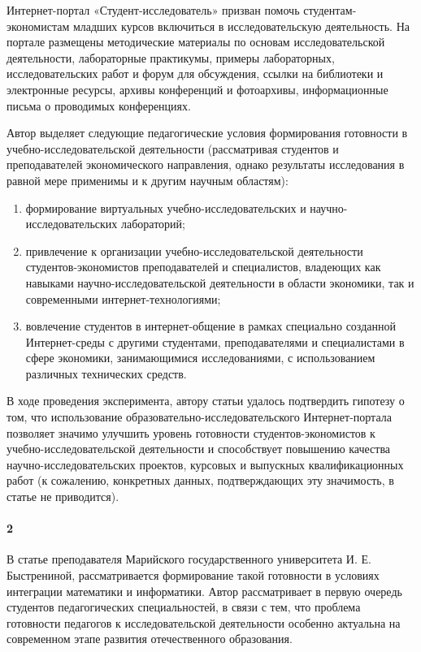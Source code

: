 \documentclass[oneside]{scrartcl}
\begin{document}
Интернет-портал «Студент-исследователь» призван помочь студентам-экономистам младших курсов включиться в исследовательскую
деятельность. На портале размещены методические материалы по основам исследовательской деятельности, лабораторные практикумы,
примеры лабораторных, исследовательских работ и форум для обсуждения, ссылки на библиотеки и электронные ресурсы, архивы
конференций и фотоархивы, информационные письма о проводимых конференциях.

Автор выделяет следующие педагогические условия формирования готовности в учебно-исследовательской деятельности (рассматривая студентов и преподавателей экономического
направления, однако результаты исследования в равной мере применимы и к другим научным областям):
\begin{enumerate}[1)]
	\item формирование виртуальных учебно-исследовательских и научно-исследовательских лабораторий;
	\item привлечение к организации учебно-исследовательской деятельности студентов-экономистов преподавателей и специалистов, владеющих как навыками научно-исследовательской 
	деятельности в области экономики, так и современными интернет-технологиями;
	\item вовлечение студентов в интернет-общение в рамках специально созданной Интернет-среды с другими студентами, преподавателями и специалистами в сфере экономики, занимающимися исследованиями, с использованием различных технических средств.
\end{enumerate}

В ходе проведения эксперимента, автору статьи удалось подтвердить гипотезу о том, что использование образовательно-исследовательского Интернет-портала позволяет значимо
улучшить уровень готовности студентов-экономистов к учебно-исследовательской деятельности и способствует повышению качества научно-исследовательских проектов, курсовых 
и выпускных квалификационных работ (к сожалению, конкретных данных, подтверждающих эту значимость, в статье не приводится).

\paragraph{2}
В статье \cite{bystrenina} преподавателя Марийского государственного университета И. Е. Быстрениной, рассматривается формирование
такой готовности в условиях интеграции математики и информатики. Автор рассматривает в первую очередь студентов педагогических
специальностей, в связи с тем, что проблема готовности педагогов к исследовательской деятельности особенно актуальна на
современном этапе развития отечественного образования.
\end{document}
